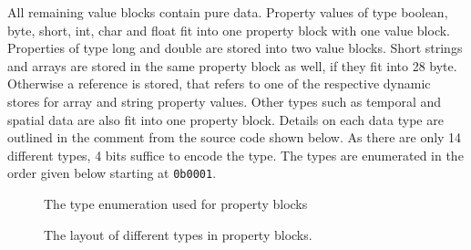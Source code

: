 \documentclass[a4paper,10pt]{article}
\begin{document}
    All remaining value blocks contain pure data. Property values of type boolean, byte, short, int, char and float fit into one property block with one value block. Properties of type long and double are stored into two value blocks. Short strings and arrays are stored in the same property block as well, if they fit into 28 byte. Otherwise a reference is stored, that refers to one of the respective dynamic stores for array and string property values. Other types such as temporal and spatial data are also fit into one property block. Details on each data type are outlined in the comment from the source code shown below. As there are only 14 different types, 4 bits suffice to encode the type. The types are enumerated in the order given below starting at \texttt{0b0001}.
    
    \begin{figure}[htp]\label{property_types}
    \begin{center}    
    \end{center}
    \caption{The type enumeration used for property blocks}
    \end{figure}
    
    \begin{figure}[htp]\label{property_Value_formats}
    \begin{center}
    \end{center}
    \caption{The layout of different types in property blocks.}
    \end{figure}
    
\end{document}
